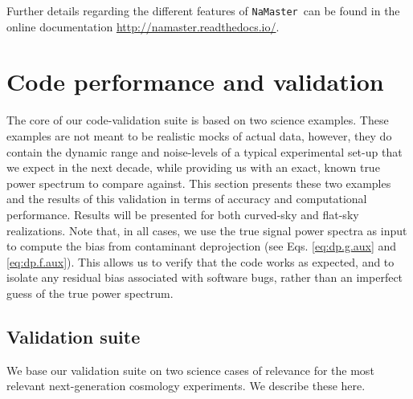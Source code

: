 \documentclass[usenatbib]{mnrasb}
\newcommand{\nmt}{{\tt NaMaster}}
\begin{document}
    Further details regarding the different features of \nmt~can be found in the online documentation \url{http://namaster.readthedocs.io/}.

  \section{Code performance and validation} \label{sec:validation}
    The core of our code-validation suite is based on two science examples. These examples are not meant to be realistic mocks of actual data, however, they do contain the dynamic range and noise-levels of a typical experimental set-up that we expect in the next decade, while providing us with an exact, known true power spectrum to compare against. This section presents these two examples and the results of this validation in terms of accuracy and computational performance. Results will be presented for both curved-sky and flat-sky realizations. Note that, in all cases, we use the true signal power spectra as input to compute the bias from contaminant deprojection (see Eqs. \ref{eq:dp.g.aux} and \ref{eq:dp.f.aux}). This allows us to verify that the code works as expected, and to isolate any residual bias associated with software bugs, rather than an imperfect guess of the true power spectrum.

    \subsection{Validation suite} \label{ssec:validation.suite}
      We base our validation suite on two science cases of relevance for the most relevant next-generation cosmology experiments. We describe these here.
      
\end{document}
